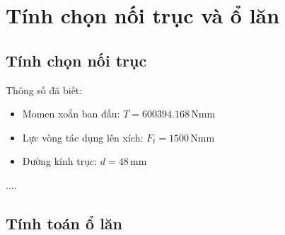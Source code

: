 \chapter{Tính chọn nối trục và ổ lăn}
\section{Tính chọn nối trục}
Thông số đã biết:
\begin{itemize}
    \item Momen xoắn ban đầu: $T = 600394.168 \, \text{Nmm}$
    \item Lực vòng tác dụng lên xích: $F_t = 1500 \, \text{Nmm}$
    \item Đường kính trục: $d = 48 \, \text{mm}$
\end{itemize}
.... 

\section{Tính toán ổ lăn}
